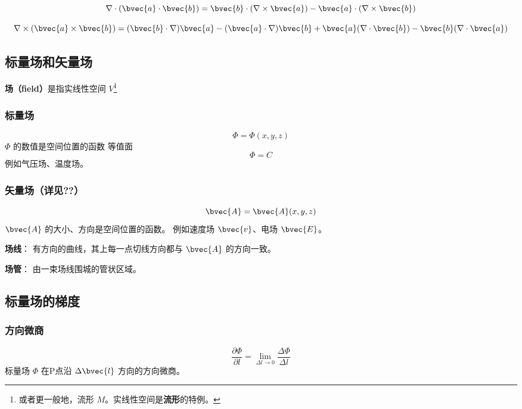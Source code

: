 \begin{equation}
\nabla\cdot(\bvec{a}\cdot\bvec{b})=\bvec{b}\cdot(\nabla\times\bvec{a})-\bvec{a}\cdot(\nabla\times\bvec{b})
\end{equation}

\begin{equation}
\nabla\times(\bvec{a}\times\bvec{b})=(\bvec{b}\cdot\nabla)\bvec{a}-(\bvec{a}\cdot\nabla)\bvec{b}+\bvec{a}(\nabla\cdot\bvec{b})-\bvec{b}(\nabla\cdot\bvec{a})
\end{equation}






\subsection{标量场和矢量场}

\textbf{场（field）}是指实线性空间 $V$\footnote{或者更一般地，流形 $M$。实线性空间是\textbf{流形}的特例。}

\subsubsection{标量场}
\begin{equation}\label{VecAnl_eq1}
\Phi=\Phi(x,y,z)
\end{equation}
 $\Phi$ 的数值是空间位置的函数
 等值面
\begin{equation}\label{VecAnl_eq2}
\Phi=C
\end{equation}
 例如气压场、温度场。
\subsubsection{矢量场（详见??）}%
\begin{equation}\label{VecAnl_eq3}
\bvec {A}= \bvec{A}(x,y,z)
\end{equation}
$\bvec{A}$ 的大小、方向是空间位置的函数。
例如速度场 $\bvec{v}$、电场 $\bvec{E}$。

\textbf{场线}： 有方向的曲线，其上每一点切线方向都与 $\bvec{A}$ 的方向一致。

\textbf{场管}： 由一束场线围城的管状区域。

\subsection{标量场的梯度}%
\subsubsection{方向微商}
\begin{equation}\label{VecAnl_eq4}
\frac{\partial \Phi}{\partial l}=\lim_{\Delta l \to 0}\frac{\Delta \Phi}{\Delta l}
\end{equation}
标量场 $\Phi$ 在P点沿 $\Delta \bvec{l} $ 方向的方向微商。

